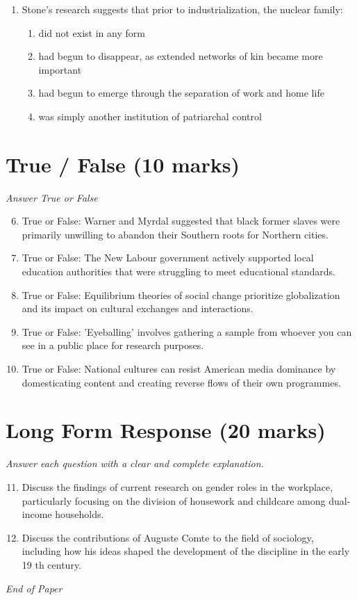\documentclass[12pt]{article}
\begin{document}
\begin{enumerate}[label=\arabic*.]
\begin{enumerate}[label=(\alph*)]
    \item issue-based concerns about culture and lifestyle
    \item false consciousness and the acceptance of hegemonic values
\end{enumerate}
\item Stone's research suggests that prior to industrialization, the nuclear family:
\begin{enumerate}[label=(\alph*)]
    \item did not exist in any form
    \item had begun to disappear, as extended networks of kin became more important
    \item had begun to emerge through the separation of work and home life
    \item was simply another institution of patriarchal control
\end{enumerate}
\end{enumerate}

\section*{True / False (10 marks)}
\textit{Answer True or False}
\begin{enumerate}[label=\arabic*.]
\setcounter{enumi}{5}
\item True or False: Warner and Myrdal suggested that black former slaves were primarily unwilling to abandon their Southern roots for Northern cities.
\item True or False: The New Labour government actively supported local education authorities that were struggling to meet educational standards.
\item True or False: Equilibrium theories of social change prioritize globalization and its impact on cultural exchanges and interactions.
\item True or False: 'Eyeballing' involves gathering a sample from whoever you can see in a public place for research purposes.
\item True or False: National cultures can resist American media dominance by domesticating content and creating reverse flows of their own programmes.
\end{enumerate}

\section*{Long Form Response (20 marks)}
\textit{Answer each question with a clear and complete explanation.}
\begin{enumerate}[label=\arabic*.]
\setcounter{enumi}{10}
\item Discuss the findings of current research on gender roles in the workplace, particularly focusing on the division of housework and childcare among dual-income households.
\item Discuss the contributions of Auguste Comte to the field of sociology, including how his ideas shaped the development of the discipline in the early 19 th century.
\end{enumerate}

\vfill
\noindent\textit{End of Paper}
\end{document}
